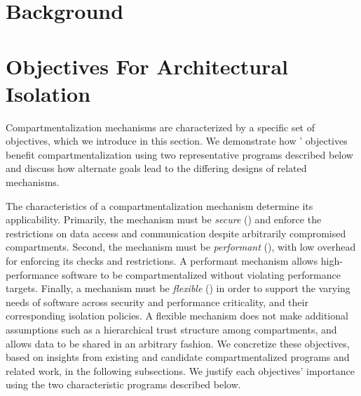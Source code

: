 \section{Background}
\label{sec:background}



\section{Objectives For Architectural Isolation}
\label{sec:reqs}

Compartmentalization mechanisms are characterized by a specific set of 
objectives, which we introduce in this section.
We demonstrate how \seccells' objectives benefit compartmentalization
using two representative programs described below and
discuss how alternate goals lead to the differing designs
of related mechanisms.

The characteristics of a compartmentalization mechanism 
determine its applicability.
Primarily, the mechanism must be \emph{secure} () 
and enforce the
restrictions on data access and communication despite arbitrarily compromised
compartments. 
Second, the mechanism must be \emph{performant} (), 
with low overhead for enforcing its checks and restrictions.
A performant mechanism allows high-performance software
to be compartmentalized without violating performance targets.
Finally, a mechanism must be \emph{flexible} () in order to 
support the varying needs of software across security and 
performance criticality, and their corresponding isolation policies.
A flexible mechanism does not make additional assumptions such as
a hierarchical trust structure among compartments, and allows
data to be shared in an arbitrary fashion.
We concretize these objectives, based on insights from existing
and candidate compartmentalized programs and related work, 
in the following subsections.
We justify each objectives' importance using the
two characteristic programs described below.

